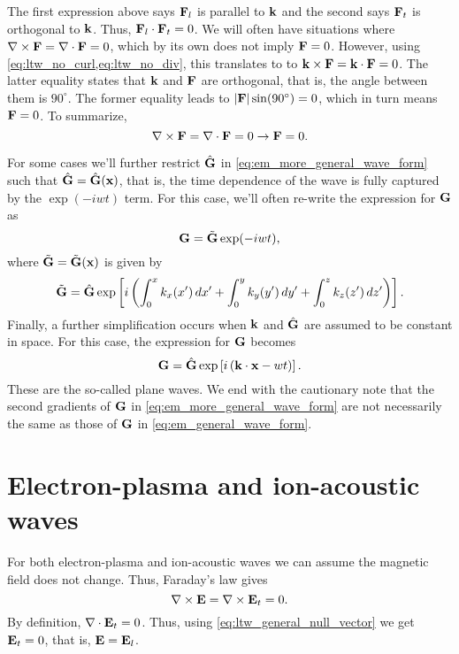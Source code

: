 \documentclass[a4paper,11pt]{report}
\begin{document}
The first expression above says $\mathbf{F}_l$ is parallel to $\mathbf{k}$ and the second says $\mathbf{F}_t$ is orthogonal to $\mathbf{k}$. Thus, $\mathbf{F}_l \cdot \mathbf{F}_t = 0$. We will often have situations where $\nabla \times \mathbf{F} = \nabla \cdot \mathbf{F} = 0$, which by its own does not imply $\mathbf{F} = 0$. However, using \cref{eq:ltw_no_curl,eq:ltw_no_div}, this translates to to $\mathbf{k} \times \mathbf{F} = \mathbf{k} \cdot \mathbf{F} =  0$. The latter equality states that $\mathbf{k}$ and $\mathbf{F}$ are orthogonal, that is, the angle between them is $90^\circ$. The former equality leads to $|\mathbf{F}| \sin(90^\circ) = 0$, which in turn means $\mathbf{F} = 0$. To summarize,
\begin{equation}
    \label{eq:ltw_general_null_vector}
    \nabla \times \mathbf{F} = \nabla \cdot \mathbf{F} = 0 \to \mathbf{F} = 0.
\end{equation}

For some cases we'll further restrict $\hat{\mathbf{G}}$ in \cref{eq:em_more_general_wave_form} such that $\hat{\mathbf{G}} = \hat{\mathbf{G}} (\mathbf{x})$, that is, the time dependence of the wave is fully captured by the $\exp(-iwt)$ term. For this case, we'll often re-write the expression for $\mathbf{G}$ as
\begin{equation}
    \label{eq:em_semi_general_wave_form}
    \mathbf{G} = \tilde{\mathbf{G}} \exp (-iwt),
\end{equation}
where $\tilde{\mathbf{G}} = \tilde{\mathbf{G}}(\mathbf{x})$ is given by
\begin{equation}
    \tilde{\mathbf{G}} = \hat{\mathbf{G}} \exp \left [ i \left ( \int_0^x k_x(x') \, dx' + \int_0^y k_y(y') \, dy' + \int_0^z k_z(z') \, dz' \right ) \right ].
\end{equation}
Finally, a further simplification occurs when $\mathbf{k}$ and $\hat{\mathbf{G}}$ are assumed to be constant in space. For this case, the expression for $\mathbf{G}$ becomes
\begin{equation}
    \label{eq:em_general_wave_form}
    \mathbf{G} = \hat{\mathbf{G}} \exp \left [i\left ( \mathbf{k} \cdot \mathbf{x} - wt \right ) \right ].
\end{equation}
These are the so-called plane waves. We end with the cautionary note that the second gradients of $\mathbf{G}$ in \cref{eq:em_more_general_wave_form} are not necessarily the same as those of $\mathbf{G}$ in \cref{eq:em_general_wave_form}.
\section{Electron-plasma and ion-acoustic waves}
For both electron-plasma and ion-acoustic waves we can assume the magnetic field does not change. Thus, Faraday's law gives
\begin{equation}
    \nabla \times \mathbf{E} = \nabla \times \mathbf{E}_t = 0.
\end{equation}
By definition, $\nabla \cdot \mathbf{E}_t = 0$. Thus, using \cref{eq:ltw_general_null_vector} we get $\mathbf{E}_t = 0$, that is, $\mathbf{E} = \mathbf{E}_l$. 
\end{document}

